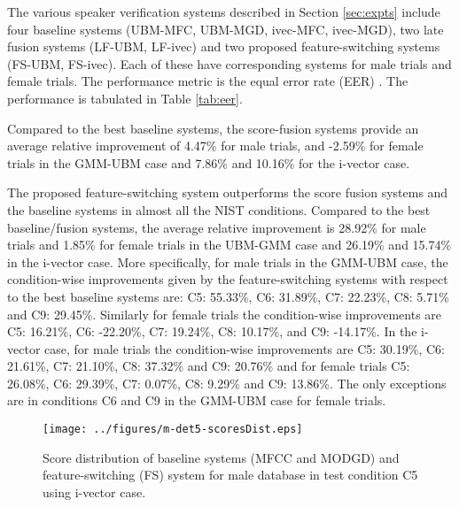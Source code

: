 \documentclass[preprint,12pt,5p]{elsarticle}
\begin{document}
The various speaker verification systems described in Section \ref{sec:expts} 
include four baseline systems (UBM-MFC, UBM-MGD, ivec-MFC, ivec-MGD), 
two late fusion systems (LF-UBM, LF-ivec) 
and two proposed feature-switching systems (FS-UBM, FS-ivec). Each of these have 
corresponding systems for male trials and female trials. The performance metric 
is the equal error rate (EER) \cite{eer1}. The performance is tabulated in Table \ref{tab:eer}.

Compared to the best baseline systems, the score-fusion systems provide an average relative 
improvement of 4.47\% for male trials, and -2.59\% for female trials in the GMM-UBM case and 
7.86\% and 10.16\% for the i-vector case. 

The proposed feature-switching system outperforms the score fusion systems and the baseline 
systems in almost all the NIST conditions. Compared to the best baseline/fusion systems, the average 
relative improvement is 28.92\% for male trials and 1.85\% for female trials in the UBM-GMM case and 
26.19\% and 15.74\% in the i-vector case. More specifically, for male trials in the GMM-UBM case, 
the condition-wise improvements given by the feature-switching systems with respect to the best 
baseline systems are: C5: 55.33\%, C6: 31.89\%, C7: 22.23\%, C8: 5.71\% and C9: 29.45\%.
Similarly for female trials the condition-wise improvements are C5: 16.21\%, C6: -22.20\%, C7: 
19.24\%, C8: 10.17\%, and C9: -14.17\%. In the i-vector case, for male trials the condition-wise 
improvements are C5: 30.19\%, C6: 21.61\%, C7: 21.10\%, C8: 37.32\% and C9: 20.76\% and 
for female trials C5: 26.08\%, C6: 29.39\%, C7: 0.07\%,  C8: 9.29\% and C9: 13.86\%. The only 
exceptions are in conditions C6 and C9 in the GMM-UBM case for female trials. %

\begin{figure*}[h!tb]
\centering
\texttt{[image: ../figures/m-det5-scoresDist.eps]}
\caption{Score distribution of baseline systems (MFCC and MODGD) and feature-switching (FS) system for male database in test condition C5 using i-vector case.}
\label{fig:scoreDist}
\end{figure*}
\end{document}
